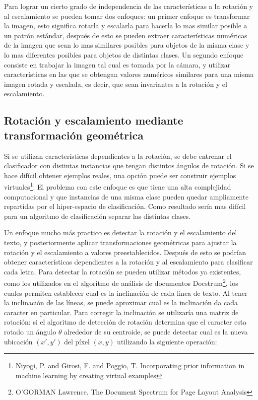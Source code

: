 \documentclass[a4paper, 11pt, oneside]{report}
\begin{document}
Para lograr un cierto grado de independencia de las características a la rotación y al escalamiento se pueden tomar dos enfoques: un primer enfoque es transformar la imagen, esto significa rotarla y escalarla para hacerla lo mas similar posible a un patrón estándar, después de esto se pueden extraer características numéricas de la imagen que sean lo mas similares posibles para objetos de la misma clase y lo mas diferentes posibles para objetos de distintas clases. Un segundo enfoque consiste en trabajar la imagen tal cual es tomada por la cámara, y utilizar características en las que se obtengan valores numéricos similares para una misma imagen rotada y escalada, es decir, que sean invariantes a la rotación y el escalamiento.

\subsection{Rotación y escalamiento mediante transformación geométrica}
\label{sect:rotation}

Si se utilizan características dependientes a la rotación, se debe entrenar el clasificador con distintas instancias que tengan distintos ángulos de rotación. Si se hace difícil obtener ejemplos reales, una opción puede ser construir ejemplos virtuales\footnote{Niyogi, P. and Girosi, F. and Poggio, T. Incorporating prior information in machine learning by creating virtual examples}. El problema con este enfoque es que tiene una alta complejidad computacional y que instancias de una misma clase pueden quedar ampliamente repartidas por el hiper-espacio de clasificación. Como resultado sería mas difícil para un algoritmo de clasificación separar las distintas clases.

Un enfoque mucho más practico es detectar la rotación y el escalamiento del texto, y posteriormente aplicar transformaciones geométricas para ajustar la rotación y el escalamiento a valores preestablecidos. Después de esto se podrían obtener características dependientes a la rotación y al escalamiento para clasificar cada letra. Para detectar la rotación se pueden utilizar métodos ya existentes, como los utilizados en el algoritmo de análisis de documentos Docstrum\footnote{O'GORMAN Lawrence. The Document Spectrum for Page Layout Analysis}, los cuales permiten establecer cual es la inclinación de cada linea de texto. Al tener la inclinación de las líneas, se puede aproximar cual es la inclinación da cada caracter en particular. Para corregir la inclinación se utilizaría una matriz de rotación: si el algoritmo de detección de rotación determina que el caracter esta rotado un ángulo $\theta$ alrededor de su centroide, se puede detectar cual es la nueva ubicación $(x', y')$ del píxel $(x, y)$ utilizando la siguiente operación:
\end{document}
